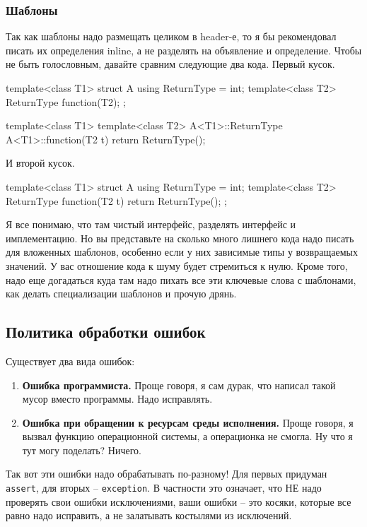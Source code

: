 \documentclass{article}
\begin{document}
\subsubsection{Шаблоны}

Так как шаблоны надо размещать целиком в header-е, то я бы рекомендовал писать их определения inline, а не разделять на объявление и определение. Чтобы не быть голословным, давайте сравним следующие два кода. Первый кусок.
\begin{cppcode}
template<class T1>
struct A {
  using ReturnType = int;
  template<class T2>
  ReturnType function(T2);
};

template<class T1>
template<class T2>
A<T1>::ReturnType A<T1>::function(T2 t) {
  return ReturnType();
}
\end{cppcode}
И второй кусок.
\begin{cppcode}
template<class T1>
struct A {
  using ReturnType = int;
  template<class T2>
  ReturnType function(T2 t) {
    return ReturnType();
  }
};
\end{cppcode}
Я все понимаю, что там чистый интерфейс, разделять интерфейс и имплементацию. Но вы представьте на сколько много лишнего кода надо писать для вложенных шаблонов, особенно если у них зависимые типы у возвращаемых значений. У вас отношение кода к шуму будет стремиться к нулю. Кроме того, надо еще догадаться куда там надо пихать все эти ключевые слова с шаблонами, как делать специализации шаблонов и прочую дрянь.


\subsection{Политика обработки ошибок}
Существует два вида ошибок:
\begin{enumerate}
\item \textbf{Ошибка программиста.} Проще говоря, я сам дурак, что написал такой мусор вместо программы. Надо исправлять.
\item \textbf{Ошибка при обращении к ресурсам среды исполнения.} Проще говоря, я вызвал функцию операционной системы, а операционка не смогла. Ну что я тут могу поделать? Ничего.
\end{enumerate}
Так вот эти ошибки надо обрабатывать по-разному! Для первых придуман \verb"assert", для вторых -- \verb"exception". В частности это означает, что НЕ надо проверять свои ошибки исключениями, ваши ошибки -- это косяки, которые все равно надо исправить, а не залатывать костылями из исключений.
\end{document}
